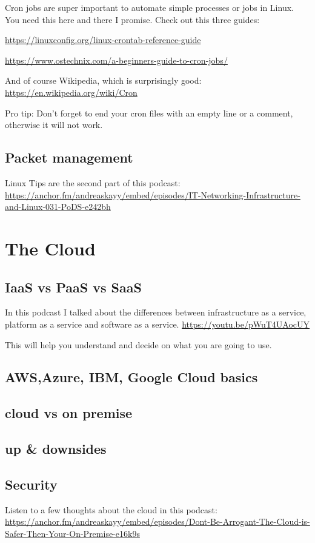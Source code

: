 \documentclass[12pt, numbers=noenddot]{scrreprt} %
\begin{document}
Cron jobs are super important to automate simple processes or jobs in Linux. You need this here and there I promise.
Check out this three guides:

\url{https://linuxconfig.org/linux-crontab-reference-guide}

\url{https://www.ostechnix.com/a-beginners-guide-to-cron-jobs/}

And of course Wikipedia, which is surprisingly good: \url{https://en.wikipedia.org/wiki/Cron}

Pro tip: Don't forget to end your cron files with an empty line or a comment, otherwise it will not work.

\section{Packet management}
Linux Tips are the second part of this podcast: \url{https://anchor.fm/andreaskayy/embed/episodes/IT-Networking-Infrastructure-and-Linux-031-PoDS-e242bh}

\chapter{The Cloud}
\section{IaaS vs PaaS vs SaaS}

In this podcast I talked about the differences between infrastructure as a service, platform as a service and software as a service. 
\url{https://youtu.be/pWuT4UAocUY}

This will help you understand and decide on what you are going to use.

\section{AWS,Azure, IBM, Google Cloud basics}
\section{cloud vs on premise}
\section{up \& downsides}
\section{Security}

Listen to a few thoughts about the cloud in this podcast: \url{https://anchor.fm/andreaskayy/embed/episodes/Dont-Be-Arrogant-The-Cloud-is-Safer-Then-Your-On-Premise-e16k9s}
\end{document}
